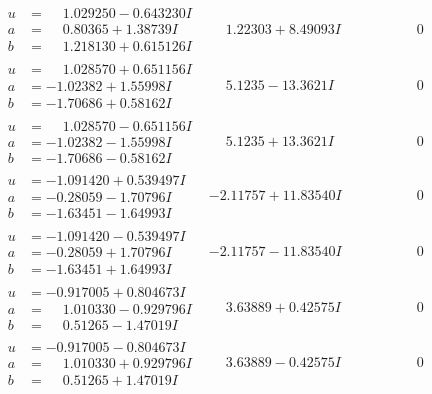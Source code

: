 \documentclass[1p]{elsarticle_modified}
\theoremstyle{definition}
\begin{document}
$$\begin{array}{c|c|c}
\begin{aligned}
u &= \phantom{-}1.029250 - 0.643230 I \\
a &= \phantom{-}0.80365 + 1.38739 I \\
b &= \phantom{-}1.218130 + 0.615126 I\end{aligned}
 & \phantom{-}1.22303 + 8.49093 I & \phantom{-0.000000 } 0 \\ \hline\begin{aligned}
u &= \phantom{-}1.028570 + 0.651156 I \\
a &= -1.02382 + 1.55998 I \\
b &= -1.70686 + 0.58162 I\end{aligned}
 & \phantom{-}5.1235 - 13.3621 I & \phantom{-0.000000 } 0 \\ \hline\begin{aligned}
u &= \phantom{-}1.028570 - 0.651156 I \\
a &= -1.02382 - 1.55998 I \\
b &= -1.70686 - 0.58162 I\end{aligned}
 & \phantom{-}5.1235 + 13.3621 I & \phantom{-0.000000 } 0 \\ \hline\begin{aligned}
u &= -1.091420 + 0.539497 I \\
a &= -0.28059 - 1.70796 I \\
b &= -1.63451 - 1.64993 I\end{aligned}
 & -2.11757 + 11.83540 I & \phantom{-0.000000 } 0 \\ \hline\begin{aligned}
u &= -1.091420 - 0.539497 I \\
a &= -0.28059 + 1.70796 I \\
b &= -1.63451 + 1.64993 I\end{aligned}
 & -2.11757 - 11.83540 I & \phantom{-0.000000 } 0 \\ \hline\begin{aligned}
u &= -0.917005 + 0.804673 I \\
a &= \phantom{-}1.010330 - 0.929796 I \\
b &= \phantom{-}0.51265 - 1.47019 I\end{aligned}
 & \phantom{-}3.63889 + 0.42575 I & \phantom{-0.000000 } 0 \\ \hline\begin{aligned}
u &= -0.917005 - 0.804673 I \\
a &= \phantom{-}1.010330 + 0.929796 I \\
b &= \phantom{-}0.51265 + 1.47019 I\end{aligned}
 & \phantom{-}3.63889 - 0.42575 I & \phantom{-0.000000 } 0 \\ \hline\begin{aligned}

\end{aligned}
\end{array}$$
\end{document}
